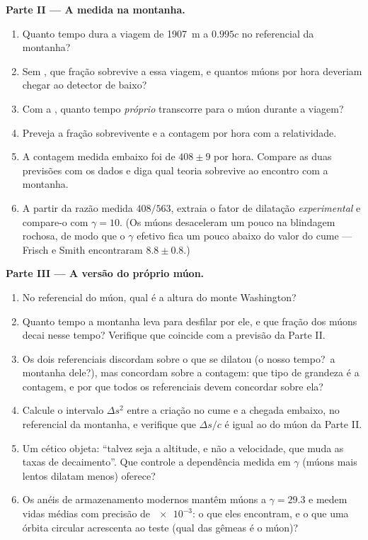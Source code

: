 \begin{problem}
\medskip\noindent\textbf{Parte II --- A medida na montanha.}
\begin{enumerate}[resume]
  \item Quanto tempo dura a viagem de \qty{1907}{m} a $0.995c$ no
        referencial da montanha?
  \item Sem , que fração sobrevive a essa viagem, e
        quantos múons por hora deveriam chegar ao detector de baixo?
  \item Com a , quanto tempo \emph{próprio}
        transcorre para o múon durante a viagem?
  \item Preveja a fração sobrevivente e a contagem por hora com a
        relatividade.
  \item A contagem medida embaixo foi de $408 \pm 9$ por hora. Compare
        as duas previsões com os dados e diga qual teoria sobrevive ao
        encontro com a montanha.
  \item A partir da razão medida $408/563$, extraia o fator de
        dilatação \emph{experimental} e compare-o com $\gamma = 10$.
        (Os múons desaceleram um pouco na blindagem rochosa, de modo
        que o $\gamma$ efetivo fica um pouco abaixo do valor do cume
        --- Frisch e Smith encontraram $8.8 \pm
        0.8$.)
\end{enumerate}

\medskip\noindent\textbf{Parte III --- A versão do próprio múon.}
\begin{enumerate}[resume]
  \item No referencial do múon, qual é a altura do monte Washington?
  \item Quanto tempo a montanha leva para desfilar por ele, e que
        fração dos múons decai nesse tempo? Verifique que coincide com
        a previsão da Parte II.
  \item Os dois referenciais discordam sobre o que se dilatou (o nosso
        tempo?\ a montanha dele?), mas concordam sobre a contagem: que
        tipo de grandeza é a contagem, e por que todos os referenciais
        devem concordar sobre ela?
  \item Calcule o intervalo $\Delta s^2$ entre a criação no cume e a
        chegada embaixo, no referencial da montanha, e verifique que
        $\Delta s/c$ é igual ao  do múon da Parte II.
  \item Um cético objeta: ``talvez seja a altitude, e não a
        velocidade, que muda as taxas de decaimento''. Que controle a
        dependência medida em $\gamma$ (múons mais lentos dilatam
        menos) oferece?
  \item Os anéis de armazenamento modernos mantêm múons a
        $\gamma = 29.3$ e medem vidas médias com precisão de
        $\num{e-3}$: o que eles encontram, e o que uma órbita circular
        acrescenta ao teste (qual das gêmeas é o múon)?
\end{enumerate}


\end{problem}
